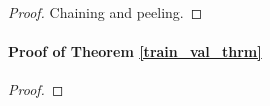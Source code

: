 \documentclass[12pt]{article}
\begin{document}
\begin{proof}
Chaining and peeling.
\end{proof}

%

\paragraph{Proof of Theorem \ref{train_val_thrm}}

\begin{proof}
%
%
%
%
%
%
\end{proof}
\end{document}
